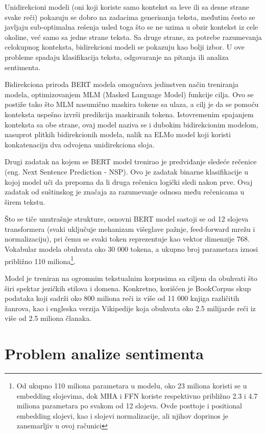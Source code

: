 \documentclass[12pt,oneside]{memoir}
\begin{document}
Unidirekcioni modeli (oni koji koriste samo kontekst sa leve ili sa desne strane svake reči) pokazuju se dobro na zadacima generisanja teksta, međutim često se javljaju sub-optimalna rešenja usled toga što se ne uzima u obzir kontekst iz cele okoline, već samo sa jedne strane teksta. Sa druge strane, za potrebe razumevanja celokupnog konteksta, bidirekcioni modeli se pokazuju kao bolji izbor. U ove probleme spadaju klasifikacija teksta, odgovaranje na pitanja ili analiza sentimenta.

Bidirekciona priroda BERT modela omogućava jedinstven način treniranja modela, optimizovanjem MLM (Masked Language Model) funkcije cilja. Ovo se postiže tako što MLM nasumično maskira tokene sa ulaza, a cilj je da se pomoću konteksta uspešno izvrši predikcija maskiranih tokena. Istovremenim spajanjem konteksta sa obe strane, ovaj model naziva se i dubokim bidirekcionim modelom, nasuprot plitkih bidirekcionih modela, nalik na ELMo\cite{ELMo} model koji koristi konkatenaciju dva odvojena unidirekciona sloja.

Drugi zadatak na kojem se BERT model trenirao je predviđanje sledeće rečenice (eng. Next Sentence Prediction - NSP). Ovo je zadatak binarne klasifikacije u kojoj model uči da prepozna da li druga rečenica logički sledi nakon prve. Ovaj zadatak od suštinskog je značaja za razumevanje odnosa među rečenicama u širem tekstu.

Što se tiče unutrašnje strukture, osnovni BERT model sastoji se od 12 slojeva transformera (svaki uključuje mehanizam višeglave pažnje, feed-forward mrežu i normalizaciju), pri čemu se svaki token reprezentuje kao vektor dimenzije 768. Vokabular modela obuhvata oko 30 000 tokena, a ukupno broj parametara iznosi približno 110 miliona\footnote{Od ukupno 110 miliona parametara u modelu, oko 23 miliona koristi se u embedding slojevima, dok MHA i FFN koriste respektivno približno 2.3 i 4.7 miliona parametara po svakom od 12 slojeva. Ovde posttoje i positional embedding slojevi, kao i slojevi normalizacije, ali njihov doprinos je zanemarljiv u ovoj računici }.


Model je treniran na ogromnim tekstualnim korpusima sa ciljem da obuhvati što širi spektar jezičkih stilova i domena. Konkretno, korišćen je BookCorpus skup podataka koji sadrži oko 800 miliona reči iz više od 11 000 knjiga različitih žanrova, kao i engleska verzija Vikipedije koja obuhvata oko 2.5 milijarde reči iz više od 2.5 miliona članaka.


\section{Problem analize sentimenta}
\end{document}
